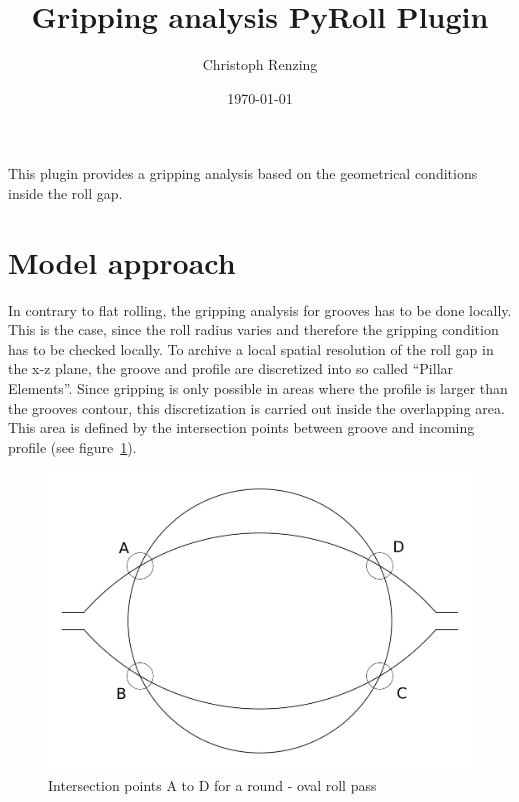 \documentclass[11pt]{PyRollDocs}
\begin{document}
    \title{Gripping analysis PyRoll Plugin}
    \author{Christoph Renzing}
    \date{\today}

    \maketitle

    This plugin provides a gripping analysis based on the geometrical conditions inside the roll gap.


    \section{Model approach}\label{sec:model-approach}

    In contrary to flat rolling, the gripping analysis for grooves has to be done locally.
    This is the case, since the roll radius varies and therefore the gripping condition has to be checked locally.
    To archive a local spatial resolution of the roll gap in the x-z plane, the groove and profile are discretized into so called \enquote{Pillar Elements}.
    Since gripping is only possible in areas where the profile is larger than the grooves contour, this discretization is carried out inside the overlapping area.
    This area is defined by the intersection points between groove and incoming profile (see figure~\ref{fig:overlapping-intersection-points}).

    \begin{figure}
        \centering
        \includegraphics[width=.7\linewidth]{img/intersection_points}
        \caption{Intersection points A to D for a round - oval roll pass}
        \label{fig:overlapping-intersection-points}
    \end{figure}
\end{document}
